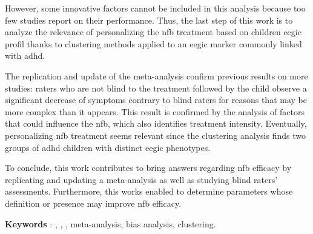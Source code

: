 However, some innovative factors cannot be included in this analysis because too few studies report on their performance.
Thus, the last step of this work is to analyze the relevance of personalizing the \gls{nfb} treatment based on children \gls{eegic} profil
thanks to clustering methods applied to an \gls{eegic} marker commonly linked with \gls{adhd}.

The replication and update of the meta-analysis confirm previous results on more studies: raters who are not blind to the treatment
followed by the child observe a significant decrease of symptoms contrary to blind raters for reasons that may be more complex 
than it appears. This result is confirmed by the analysis of factors that could influence the \gls{nfb}, which also identifies 
treatment intensity. Eventually, personalizing \gls{nfb} treatment seems relevant since the clustering analysis finds two groups
of \gls{adhd} children with distinct \gls{eegic} phenotypes. 

To conclude, this work contributes to bring answers regarding \gls{nfb} efficacy by replicating and updating a meta-analysis as well 
as studying blind raters' assessments. Furthermore, this works enabled to determine parameters whose definition or presence may improve
\gls{nfb} efficacy.

\large{\textbf{Keywords}} : , , , meta-analysis, bias analysis, clustering.